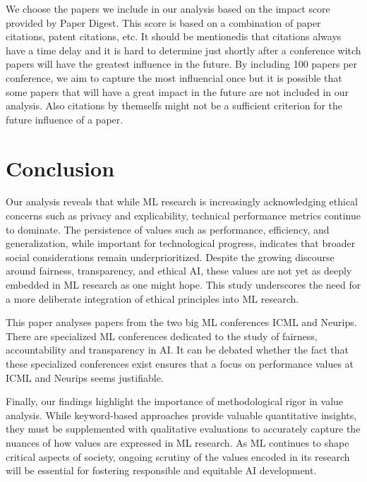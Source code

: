 \documentclass{article}
\begin{document}
We choose the papers we include in our analysis based on the impact score provided by Paper Digest. This score is based on a combination of paper citations, patent citations, etc. It should be mentionedis that
citations always have a time delay and it is hard to determine just shortly after a conference witch papers will have the greatest influence in the future. By including 100 papers per conference, we aim to 
capture the most influencial once but it is possible that some papers that will have a great impact in the future are not included in our analysis. Also citations by themselfs might not be a sufficient criterion for the future influence of a paper. 

\section{Conclusion}
Our analysis reveals that while ML research is increasingly acknowledging ethical concerns such as privacy and explicability, technical performance metrics continue to dominate. 
The persistence of values such as performance, efficiency, and generalization, while important for technological progress, indicates that broader social considerations remain underprioritized. 
Despite the growing discourse around fairness, transparency, and ethical AI, these values are not yet as deeply embedded in ML research as one might hope. 
This study underscores the need for a more deliberate integration of ethical principles into ML research.

This paper analyses papers from the two big ML conferences ICML and Neurips. There are specialized ML conferences dedicated to the study of fairness, accountability and transparency in AI. It can be debated whether the fact that these specialized conferences exist ensures that a focus on performance values at ICML and Neurips seems justifiable. 

Finally, our findings highlight the importance of methodological rigor in value analysis. While keyword-based approaches provide valuable quantitative insights, they must be supplemented with 
qualitative evaluations to accurately capture the nuances of how values are expressed in ML research. As ML continues to shape critical aspects of society, ongoing scrutiny of the values encoded in its 
research will be essential for fostering responsible and equitable AI development.






\end{document}
